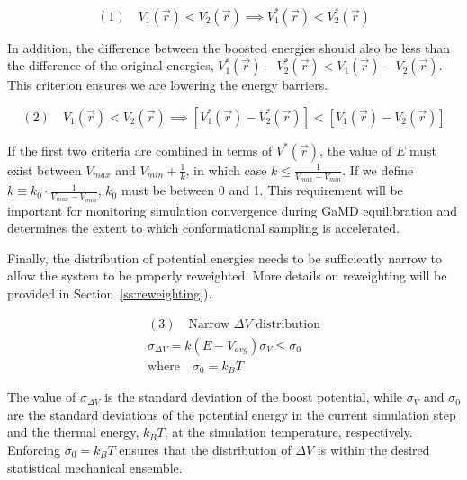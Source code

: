 \documentclass[9pt,tutorial,pubversion]{livecoms}
\begin{document}
\begin{equation*}
    \boxed{(1)\quad V_{1}\left(\vec{r}\right) < V_{2}\left(\vec{r}\right) \implies V_{1}^{*}\left(\vec{r}\right) < V_{2}^{*}\left(\vec{r}\right)}
\end{equation*}

In addition, the difference between the boosted energies should also be less than the difference of the original energies, $V_{1}^{*}\left(\vec{r}\right) - V_{2}^{*}\left(\vec{r}\right) < V_{1}\left(\vec{r}\right) - V_{2}\left(\vec{r}\right)$. This criterion ensures we are lowering the energy barriers.

\begin{equation*}
    \boxed{(2)\quad V_{1}\left(\vec{r}\right) < V_{2}\left(\vec{r}\right) \implies \left[V_{1}^{*}\left(\vec{r}\right) - V_{2}^{*}\left(\vec{r}\right)\right] < \left[V_{1}\left(\vec{r}\right) - V_{2}\left(\vec{r}\right)\right]}
\end{equation*}

If the first two criteria are combined in terms of $V^{*}(\vec{r})$, the value of $E$ must exist between $V_{max}$ and $V_{min} + \frac{1}{k}$, in which case $k \leq \frac{1}{V_{max} - V_{min}}$. If we define $k \equiv k_{0} \cdot \frac{1}{V_{max} - V_{min}}$, $k_{0}$ must be between 0 and 1. This requirement will be important for monitoring simulation convergence during GaMD equilibration and determines the extent to which conformational sampling is accelerated. 

Finally, the distribution of potential energies needs to be sufficiently narrow to allow the system to be properly reweighted. More details on reweighting will be provided in Section~\ref{ss:reweighting}). 

\begin{equation*}
    \boxed{
    \begin{gathered}
        (3)\quad\text{Narrow $\Delta{V}$ distribution} \\
        \sigma_{\Delta{V}} = k(E-V_{avg})\sigma_{V} \leq \sigma_{0} \\
        \text{where} \quad \sigma_{0}= k_{B}T
    \end{gathered}
    }
\end{equation*}

The value of $\sigma_{\Delta{V}}$ is the standard deviation of the boost potential, while $\sigma_{V}$ and $\sigma_{0}$ are the standard deviations of the potential energy in the current simulation step and the thermal energy, $k_BT$, at the simulation temperature, respectively. Enforcing $\sigma_{0} = k_BT$ ensures that the distribution of $\Delta{V}$ is within the desired statistical mechanical ensemble.
\end{document}
